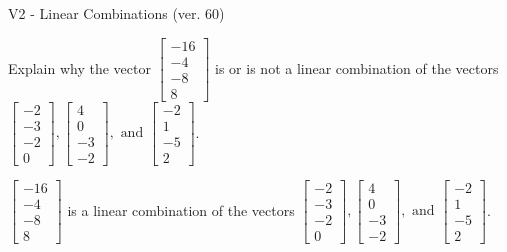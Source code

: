 \begin{exercise}
  \begin{exerciseTitle}V2 - Linear Combinations (ver. 60)\end{exerciseTitle}
  \begin{exerciseStatement}
    Explain why the vector \(\left[\begin{array}{c}
-16 \\
-4 \\
-8 \\
8
\end{array}\right]\)  is or is not a linear 
	combination of the vectors \(\left[\begin{array}{c}
-2 \\
-3 \\
-2 \\
0
\end{array}\right] , \left[\begin{array}{c}
4 \\
0 \\
-3 \\
-2
\end{array}\right] , \text{ and } \left[\begin{array}{c}
-2 \\
1 \\
-5 \\
2
\end{array}\right]\).
	


  \end{exerciseStatement}
  \begin{exerciseAnswer}
   \(\left[\begin{array}{c}
-16 \\
-4 \\
-8 \\
8
\end{array}\right]\) 
  	 is  
	a linear combination of the vectors \(\left[\begin{array}{c}
-2 \\
-3 \\
-2 \\
0
\end{array}\right] , \left[\begin{array}{c}
4 \\
0 \\
-3 \\
-2
\end{array}\right] , \text{ and } \left[\begin{array}{c}
-2 \\
1 \\
-5 \\
2
\end{array}\right]\).

	
  


  \end{exerciseAnswer}
\end{exercise}